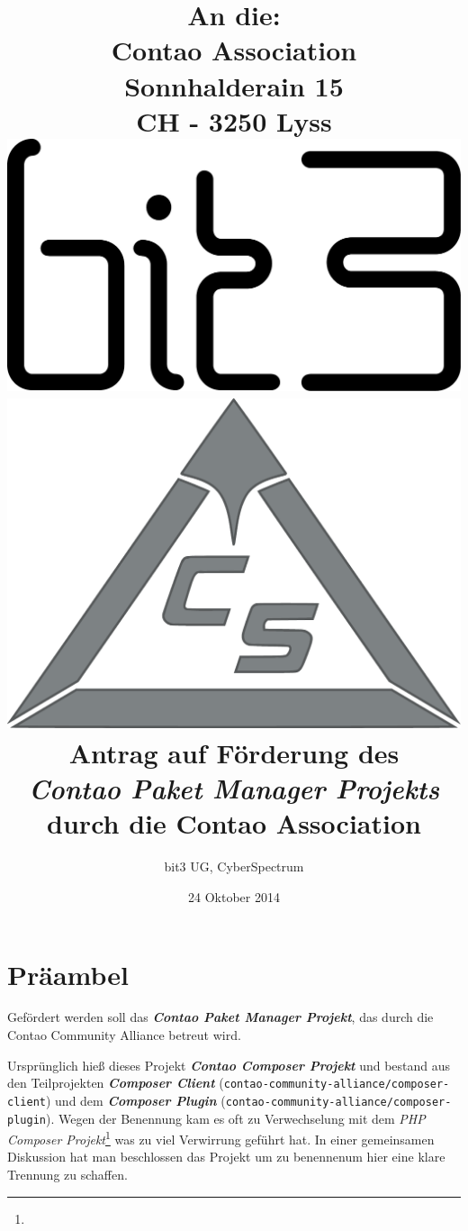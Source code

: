 \documentclass[
paper=a4,
draft=false,%
fontsize=10pt%
]{scrartcl}
\newcommand{\contaoPackageManagerProject}{\textbf{\textit{Contao Paket Manager Projekt}}}
\newcommand{\composerClient}{\textbf{\textit{Composer Client}}}
\newcommand{\composerPlugin}{\textbf{\textit{Composer Plugin}}}
\begin{document}
\title{%
An die:\\
Contao Association\\
Sonnhalderain 15\\
CH - 3250 Lyss\\
\vspace*{1cm}%
\href{https://bit3.de}{\includegraphics[width=.2\textwidth]{bilder/bit3}}%
\hspace*{1cm}%
\href{https://www.cyberspectrum.de/}{\includegraphics[width=.2\textwidth]{bilder/cyberspectrum}}%
\vspace*{1cm}\\
Antrag auf Förderung des \\
\textit{Contao Paket Manager Projekts} \\
durch die Contao Association\\%
}
\date{24 Oktober 2014}
\author{bit3 UG, CyberSpectrum}
\maketitle

\pagebreak

%
%

\section*{Präambel}
\label{sec:preamble}

Gefördert werden soll das \contaoPackageManagerProject{}, das durch die Contao Community Alliance betreut wird.

\begin{emquotation}
Ursprünglich hieß dieses Projekt \textbf{\textit{Contao Composer Projekt}} und bestand aus den Teilprojekten \composerClient{} (\texttt{contao-community-alliance/composer-client}) und dem \composerPlugin{} (\texttt{contao-community-alliance/composer-plugin}). Wegen der Benennung kam es oft zu Verwechselung mit dem \textit{PHP Composer Projekt}\footnote{} was zu viel Verwirrung geführt hat. In einer gemeinsamen Diskussion hat man beschlossen das Projekt um zu benennen\footnotemark um hier eine klare Trennung zu schaffen.
\end{emquotation}
\end{document}
